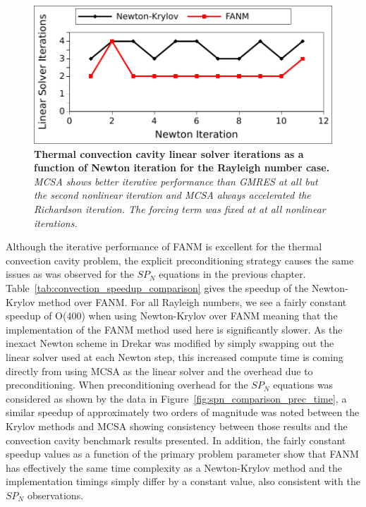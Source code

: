 \begin{figure}[t!]
  \begin{center}
    \includegraphics[width=6in]{chapters/nonlinear_problem/convection_ra1e6_iters.pdf}
  \end{center}
  \caption{\textbf{Thermal convection cavity linear solver iterations
      as a function of Newton iteration for the  Rayleigh
      number case.} \textit{MCSA shows better iterative performance
      than GMRES at all but the second nonlinear iteration and MCSA
      always accelerated the Richardson iteration. The forcing term
      was fixed at  at all nonlinear iterations.}}
  \label{fig:ra1e6_linear_iters}
\end{figure}

Although the iterative performance of FANM is excellent for the
thermal convection cavity problem, the explicit preconditioning
strategy causes the same issues as was observed for the $SP_N$
equations in the previous
chapter. Table~\ref{tab:convection_speedup_comparison} gives the
speedup of the Newton-Krylov method over FANM. For all Rayleigh
numbers, we see a fairly constant speedup of O(400) when using
Newton-Krylov over FANM meaning that the implementation of the FANM
method used here is significantly slower. As the inexact Newton scheme
in Drekar was modified by simply swapping out the linear solver used
at each Newton step, this increased compute time is coming directly
from using MCSA as the linear solver and the overhead due to
preconditioning. When preconditioning overhead for the $SP_N$
equations was considered as shown by the data in
Figure~\ref{fig:spn_comparison_prec_time}, a similar speedup of
approximately two orders of magnitude was noted between the Krylov
methods and MCSA showing consistency between those results and the
convection cavity benchmark results presented. In addition, the fairly
constant speedup values as a function of the primary problem parameter
show that FANM has effectively the same time complexity as a
Newton-Krylov method and the implementation timings simply differ by a
constant value, also consistent with the $SP_N$ observations.

